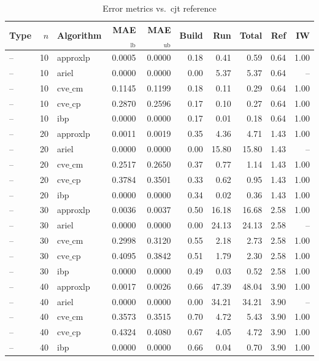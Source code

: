 \begin{table}[ht]
\centering
\scriptsize
\caption{Error metrics vs.\ cjt reference}
\begin{tabular}{lrlrrrrrrr}
\toprule
Type & $n$ & Algorithm & MAE$_{\text{lb}}$ & MAE$_{\text{ub}}$ & Build & Run & Total & Ref & IW \\
\midrule
-- & 10 & approxlp & 0.0005 & 0.0000 & 0.18 & 0.41 & 0.59 & 0.64 & 1.00 \\
-- & 10 & ariel & 0.0000 & 0.0000 & 0.00 & 5.37 & 5.37 & 0.64 & -- \\
-- & 10 & $\text{cve\_cm}$ & 0.1145 & 0.1199 & 0.18 & 0.11 & 0.29 & 0.64 & 1.00 \\
-- & 10 & $\text{cve\_cp}$ & 0.2870 & 0.2596 & 0.17 & 0.10 & 0.27 & 0.64 & 1.00 \\
-- & 10 & ibp & 0.0000 & 0.0000 & 0.17 & 0.01 & 0.18 & 0.64 & 1.00 \\
-- & 20 & approxlp & 0.0011 & 0.0019 & 0.35 & 4.36 & 4.71 & 1.43 & 1.00 \\
-- & 20 & ariel & 0.0000 & 0.0000 & 0.00 & 15.80 & 15.80 & 1.43 & -- \\
-- & 20 & $\text{cve\_cm}$ & 0.2517 & 0.2650 & 0.37 & 0.77 & 1.14 & 1.43 & 1.00 \\
-- & 20 & $\text{cve\_cp}$ & 0.3784 & 0.3501 & 0.33 & 0.62 & 0.95 & 1.43 & 1.00 \\
-- & 20 & ibp & 0.0000 & 0.0000 & 0.34 & 0.02 & 0.36 & 1.43 & 1.00 \\
-- & 30 & approxlp & 0.0036 & 0.0037 & 0.50 & 16.18 & 16.68 & 2.58 & 1.00 \\
-- & 30 & ariel & 0.0000 & 0.0000 & 0.00 & 24.13 & 24.13 & 2.58 & -- \\
-- & 30 & $\text{cve\_cm}$ & 0.2998 & 0.3120 & 0.55 & 2.18 & 2.73 & 2.58 & 1.00 \\
-- & 30 & $\text{cve\_cp}$ & 0.4095 & 0.3842 & 0.51 & 1.79 & 2.30 & 2.58 & 1.00 \\
-- & 30 & ibp & 0.0000 & 0.0000 & 0.49 & 0.03 & 0.52 & 2.58 & 1.00 \\
-- & 40 & approxlp & 0.0017 & 0.0026 & 0.66 & 47.39 & 48.04 & 3.90 & 1.00 \\
-- & 40 & ariel & 0.0000 & 0.0000 & 0.00 & 34.21 & 34.21 & 3.90 & -- \\
-- & 40 & $\text{cve\_cm}$ & 0.3573 & 0.3515 & 0.70 & 4.72 & 5.43 & 3.90 & 1.00 \\
-- & 40 & $\text{cve\_cp}$ & 0.4324 & 0.4080 & 0.67 & 4.05 & 4.72 & 3.90 & 1.00 \\
-- & 40 & ibp & 0.0000 & 0.0000 & 0.66 & 0.04 & 0.70 & 3.90 & 1.00 \\

\end{tabular}
\end{table}
